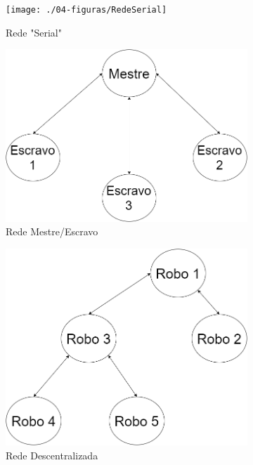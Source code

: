 \begin{figure}
	\centering
	\begin{subfigure}{.5\textwidth}
		\centering
		\texttt{[image: ./04-figuras/RedeSerial]}
		\caption{Rede "Serial"}
		\label{fig:redeserial1}
	\end{subfigure}%
	\begin{subfigure}{.5\textwidth}
		\centering
		\includegraphics[width=.9\linewidth]{./04-figuras/RedeNXC}
		\caption{Rede Mestre/Escravo}
		\label{fig:redenxt}
	\end{subfigure}
	\begin{subfigure}{.45\textwidth}
		\centering
		\includegraphics[width=.9\linewidth]{./04-figuras/RedeDistribuida}
		\caption{Rede Descentralizada}
		\label{fig:rededistr}
	\end{subfigure}
	\begin{subfigure}{.45\textwidth}

\end{subfigure}
\end{figure}
